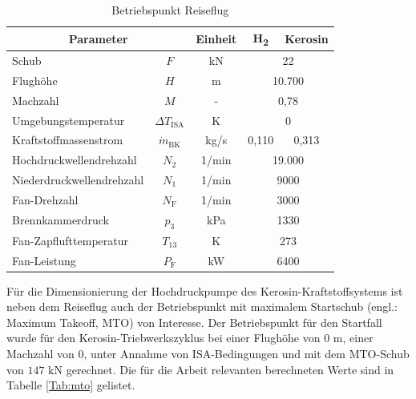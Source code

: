 \begin{table}[ht]
    \centering
	\caption{Betriebspunkt Reiseflug}
	\begin{tabular} {|l|c|c|c|c|} \hline%
    \multicolumn{2}{|c|}{Parameter} & Einheit & H\textsubscript{2} & Kerosin \\ \hline\hline%
    Schub & $F$ & kN & \multicolumn{2}{c|}{22} \\ \hline
    Flughöhe & $H$ & m & \multicolumn{2}{c|}{10.700} \\ \hline
    Machzahl & $M$ & - & \multicolumn{2}{c|}{0,78} \\ \hline
    Umgebungstemperatur & $\Delta T_{\mathrm{ISA}}$ & K & \multicolumn{2}{c|}{0} \\ \hline\hline
    Kraftstoffmassenstrom & $\dot{m}_\mathrm{BK}$& kg/s & 0,110 & 0,313 \\ \hline
    Hochdruckwellendrehzahl & $N_2$ & 1/min & \multicolumn{2}{c|}{19.000} \\ \hline
    Niederdruckwellendrehzahl & $N_1$ & 1/min & \multicolumn{2}{c|}{9000} \\ \hline
    Fan-Drehzahl & $N_\mathrm{F}$ & 1/min & \multicolumn{2}{c|}{3000} \\ \hline
    Brennkammerdruck & $p_3$ & kPa & \multicolumn{2}{c|}{1330} \\ \hline
    Fan-Zapflufttemperatur & $T_{13}$ & K & \multicolumn{2}{c|}{273} \\ \hline
    Fan-Leistung & $P_\mathrm{F}$ & kW & \multicolumn{2}{c|}{6400} \\ \hline
    \end{tabular}	
    \label{Tab:cruise}%
\end{table}
\FloatBarrier 

Für die Dimensionierung der Hochdruckpumpe des Kerosin-Kraftstoffsystems ist neben dem Reiseflug auch der Betriebspunkt mit maximalem Startschub (engl.: Maximum Takeoff, MTO) von Interesse. Der Betriebspunkt für den Startfall wurde für den Kerosin-Triebwerkszyklus bei einer Flughöhe von $0$ m, einer Machzahl von $0$, unter Annahme von ISA-Bedingungen und mit dem MTO-Schub von $147$ kN gerechnet. Die für die Arbeit relevanten berechneten Werte sind in Tabelle \ref{Tab:mto} gelistet.

